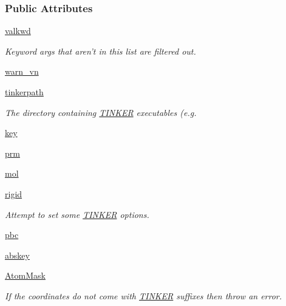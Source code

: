 \subsubsection*{Public Attributes}
\begin{DoxyCompactItemize}
\item 
\hyperlink{classforcebalance_1_1tinkerio_1_1TINKER_ab9a4b2893724d9298a858477d31e46a5}{valkwd}
\begin{DoxyCompactList}\small\item\em Keyword args that aren't in this list are filtered out. \end{DoxyCompactList}\item 
\hyperlink{classforcebalance_1_1tinkerio_1_1TINKER_accc63c58abe79aea21fb74b1b6f99214}{warn\-\_\-vn}
\item 
\hyperlink{classforcebalance_1_1tinkerio_1_1TINKER_afff41f58d443d1a202227c75aaaf5ec4}{tinkerpath}
\begin{DoxyCompactList}\small\item\em The directory containing \hyperlink{classforcebalance_1_1tinkerio_1_1TINKER}{T\-I\-N\-K\-E\-R} executables (e.\-g. \end{DoxyCompactList}\item 
\hyperlink{classforcebalance_1_1tinkerio_1_1TINKER_aaf8b049b7a15899cd4c644d936e90976}{key}
\item 
\hyperlink{classforcebalance_1_1tinkerio_1_1TINKER_ad0d8dfd8b8f2848c0f8e62c14575ca89}{prm}
\item 
\hyperlink{classforcebalance_1_1tinkerio_1_1TINKER_aed2329014887793404d2d49b7e8c54ed}{mol}
\item 
\hyperlink{classforcebalance_1_1tinkerio_1_1TINKER_a9abbee24076b6516dbf51f829b212898}{rigid}
\begin{DoxyCompactList}\small\item\em Attempt to set some \hyperlink{classforcebalance_1_1tinkerio_1_1TINKER}{T\-I\-N\-K\-E\-R} options. \end{DoxyCompactList}\item 
\hyperlink{classforcebalance_1_1tinkerio_1_1TINKER_aff7dd4c7e503ae1ad00317acdca1f7d4}{pbc}
\item 
\hyperlink{classforcebalance_1_1tinkerio_1_1TINKER_ada313a70357c2d3a1b240f6d6ef41a4d}{abskey}
\item 
\hyperlink{classforcebalance_1_1tinkerio_1_1TINKER_a17a5941d3b43e4b8671c38fb2683c074}{Atom\-Mask}
\begin{DoxyCompactList}\small\item\em If the coordinates do not come with \hyperlink{classforcebalance_1_1tinkerio_1_1TINKER}{T\-I\-N\-K\-E\-R} suffixes then throw an error. \end{DoxyCompactList}\item 

\end{DoxyCompactItemize}
